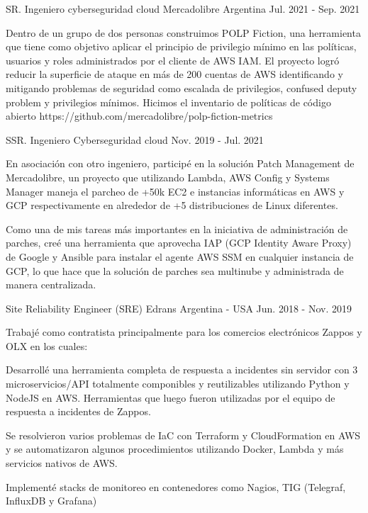 \begin{cventries}
	\cventry
	{SR. Ingeniero cyberseguridad cloud} %
	{Mercadolibre} %
	{Argentina} %
	{Jul. 2021 - Sep. 2021} %
	{
		\begin{cvitems} %
			\item {Dentro de un grupo de dos personas construimos POLP Fiction, una herramienta que tiene como objetivo aplicar el principio de privilegio mínimo en las políticas, usuarios y roles administrados por el cliente de AWS IAM. El proyecto logró reducir la superficie de ataque en más de 200 cuentas de AWS identificando y mitigando problemas de seguridad como escalada de privilegios, confused deputy problem y privilegios mínimos. Hicimos el inventario de políticas de código abierto https://github.com/mercadolibre/polp-fiction-metrics}
		\end{cvitems}
	}
	\cventry
	{SSR. Ingeniero Cyberseguridad cloud} %
	{} %
	{} %
	{Nov. 2019 - Jul. 2021} %
	{
		\begin{cvitems} %
			\item {En asociación con otro ingeniero, participé en la solución Patch Management de Mercadolibre, un proyecto que utilizando Lambda, AWS Config y Systems Manager maneja el parcheo de +50k EC2 e instancias informáticas en AWS y GCP respectivamente en alrededor de +5 distribuciones de Linux diferentes.}
			\item {Como una de mis tareas más importantes en la iniciativa de administración de parches, creé una herramienta que aprovecha IAP (GCP Identity Aware Proxy) de Google y Ansible para instalar el agente AWS SSM en cualquier instancia de GCP, lo que hace que la solución de parches sea multinube y administrada de manera centralizada.}
		\end{cvitems}
	}

	\cventry
    {Site Reliability Engineer (SRE)} %
	{Edrans} %
	{Argentina - USA} %
	{Jun. 2018 - Nov. 2019} %
	{
		{Trabajé como contratista principalmente para los comercios electrónicos Zappos y OLX en los cuales:}
		\linebreak
		\begin{cvitems} %
			\item {Desarrollé una herramienta completa de respuesta a incidentes sin servidor con 3 microservicios/API totalmente componibles y reutilizables utilizando Python y NodeJS en AWS. Herramientas que luego fueron utilizadas por el equipo de respuesta a incidentes de Zappos.}
			\item {Se resolvieron varios problemas de IaC con Terraform y CloudFormation en AWS y se automatizaron algunos procedimientos utilizando Docker, Lambda y más servicios nativos de AWS.}
			\item {Implementé stacks de monitoreo en contenedores como Nagios, TIG (Telegraf, InfluxDB y Grafana)}
		\end{cvitems}
	}


\end{cventries}
